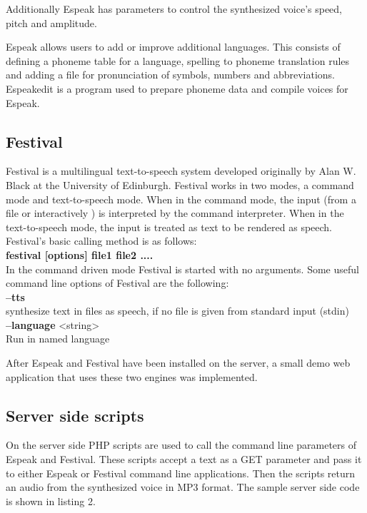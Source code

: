 \documentclass[11pt,a4paper,oneside,article]{memoir}
\begin{document}
\setlength{\leftskip}{0pt}

Additionally Espeak has parameters to control the synthesized voice's speed, pitch and amplitude.

Espeak allows users to add or improve additional languages. This consists of defining a phoneme table for a language, spelling to phoneme translation rules and adding a file for pronunciation of symbols, numbers and abbreviations. Espeakedit is a program used to prepare phoneme data and compile voices for Espeak. 

%

\subsection{Festival}
Festival is a multilingual text-to-speech system developed originally by Alan W. Black at the  University of Edinburgh. \cite{hut} Festival works in two modes, a command mode and text-to-speech mode. When in the command mode, the input (from a file or interactively ) is interpreted by the command interpreter. When in the text-to-speech mode, the input is treated as text to be rendered as speech.
Festival's basic calling method is as follows:\\
\textbf{festival [options] file1 file2 ....}\\
In the command driven mode Festival is started with no arguments. Some useful command line options of Festival are the following:\\

\textbf{--tts}\\
synthesize text in files as speech, if no file is given from standard input (stdin)\\
\textbf{--language} <string>\\
Run in named language

After Espeak and Festival have been installed on the server, a small demo web application that uses these two engines was implemented. 

\subsection{Server side scripts}
On the server side PHP scripts are used to call the command line parameters of Espeak and Festival. These scripts accept a text as a GET parameter and pass it to either Espeak or Festival command line applications. Then the scripts return an audio from the synthesized voice in MP3 format. The sample server side code is shown in listing 2. 
\end{document}

